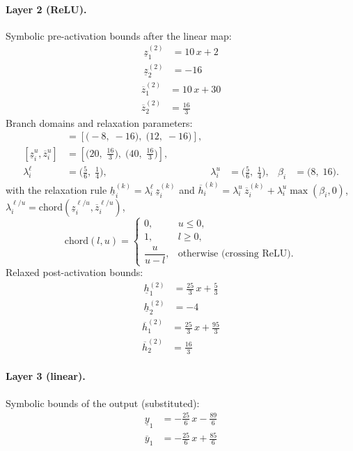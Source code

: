 \documentclass[11pt]{article}
\begin{document}
\paragraph{Layer 2 (ReLU).}
Symbolic pre-activation bounds after the linear map:
\begin{align*}
\underline{z}^{(2)}_{1} &= 10\,x + 2 \\
\underline{z}^{(2)}_{2} &= -16
\end{align*}
\begin{align*}
\overline{z}^{(2)}_{1} &= 10\,x + 30 \\
\overline{z}^{(2)}_{2} &= \frac{16}{3}
\end{align*}
Branch domains and relaxation parameters:
\begin{align*}
[\underline{z}^{\ell}_i, \overline{z}^{\ell}_i] &= [\bigl(-8,\; -16\bigr),\; \bigl(12,\; -16\bigr)], \\ 
[\underline{z}^{u}_i, \overline{z}^{u}_i] &= [\bigl(20,\; \frac{16}{3}\bigr),\; \bigl(40,\; \frac{16}{3}\bigr)], \\
\lambda^{\ell}_i &= \bigl(\frac{5}{6},\; \frac{1}{4}\bigr), & \lambda^{u}_i &= \bigl(\frac{5}{6},\; \frac{1}{4}\bigr), & \beta_i &= \bigl(8,\; 16\bigr).
\end{align*}
with the relaxation rule
$\underline{h}^{(k)}_i = \lambda^{\ell}_i\, \underline{z}^{(k)}_i$ and
$\overline{h}^{(k)}_i = \lambda^{u}_i\, \overline{z}^{(k)}_i + \lambda^{u}_i \max(\beta_i, 0)$,
$\lambda^{\ell/u}_i = \mathrm{chord}(\underline{z}_i^{\ell/u}, \overline{z}_i^{\ell/u})$,
\[
\mathrm{chord}(l, u) =
\begin{cases}
0, & u \le 0,\\
1, & l \ge 0,\\
\dfrac{u}{u - l}, & \text{otherwise (crossing ReLU)}.
\end{cases}\]
Relaxed post-activation bounds:
\begin{align*}
\underline{h}^{(2)}_{1} &= \frac{25}{3}\,x + \frac{5}{3} \\
\underline{h}^{(2)}_{2} &= -4
\end{align*}
\begin{align*}
\overline{h}^{(2)}_{1} &= \frac{25}{3}\,x + \frac{95}{3} \\
\overline{h}^{(2)}_{2} &= \frac{16}{3}
\end{align*}
\paragraph{Layer 3 (linear).}
Symbolic bounds of the output (substituted):
\begin{align*}
\underline{y}_{1} &= -\frac{25}{6}\,x - \frac{89}{6}
\end{align*}
\begin{align*}
\overline{y}_{1} &= -\frac{25}{6}\,x + \frac{85}{6}
\end{align*}
\end{document}
